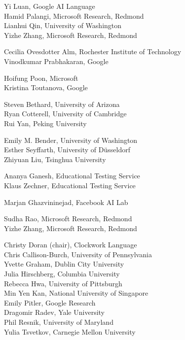 \documentclass[11pt]{article}
\newcommand{\aclitem}[1][]{\item[#1:\vspace{2mm}]}
\begin{document}
\begin{description}[itemsep=4mm, style=nextline]
\aclitem[Virtual Infrastructure Committee]
Yi Luan, Google AI Language\\
Hamid Palangi, Microsoft Research, Redmond\\
Lianhui Qin, University of Washington\\
Yizhe Zhang, Microsoft Research, Redmond

\aclitem[Diversity \& Inclusion (D\&I) Chairs]
Cecilia Ovesdotter Alm, Rochester Institute of Technology\\
Vinodkumar Prabhakaran, Google

\aclitem[Local Sponsorship Chairs]
Hoifung Poon, Microsoft\\
Kristina Toutanova, Google

\aclitem[Publication Chairs]
Steven Bethard, University of Arizona\\
Ryan Cotterell, University of Cambridge\\
Rui Yan, Peking University

\aclitem[Publicity Chairs]
Emily M. Bender, University of Washington\\
Esther Seyffarth, University of D\"{u}sseldorf\\
Zhiyuan Liu, Tsinghua University 

\aclitem[Sustainability Chair]
Ananya Ganesh, Educational Testing Service\\
Klaus Zechner, Educational Testing Service

\aclitem[Student Volunteer Coordinator]
Marjan Ghazvininejad, Facebook AI Lab

\aclitem[Website \& Conference App Chairs]
Sudha Rao, Microsoft Research, Redmond\\
Yizhe Zhang, Microsoft Research, Redmond

\aclitem[Best Paper Committee]
Christy Doran (chair), Clockwork Language\\
Chris Callison-Burch, University of Pennsylvania\\
Yvette Graham, Dublin City University\\
Julia Hirschberg, Columbia University\\
Rebecca Hwa, University of Pittsburgh\\
Min Yen Kan, National University of Singapore\\
Emily Pitler, Google Research\\
Dragomir Radev, Yale University\\
Phil Resnik, University of Maryland\\
Yulia Tsvetkov, Carnegie Mellon University

\end{description}
\end{document}
